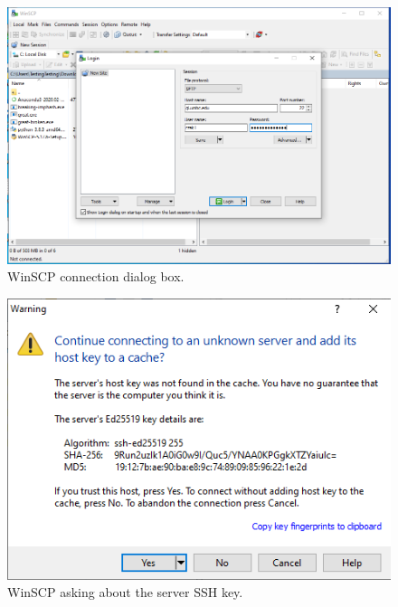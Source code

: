 \documentclass[letter,11pt]{article}
\begin{document}
\begin{figure}
\centering
\includegraphics[scale=0.6]{Images/winscp_gl_connect.png}
\caption{WinSCP connection dialog box.}
\label{fig:winscpconnect}
\end{figure}

\begin{figure}
\centering
\includegraphics[scale=0.7]{Images/winscp_connect_first_time.png}
\caption{WinSCP asking about the server SSH key.}
\label{fig:winscpconnectfirsttime}
\end{figure}
\end{document}
